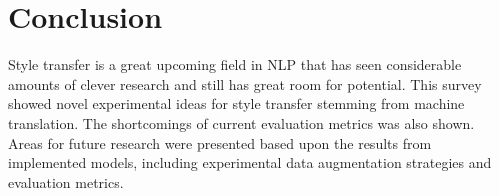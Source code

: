 \documentclass[12pt]{article}
\begin{document}
\section{Conclusion}
Style transfer is a great upcoming field in NLP that has seen 
considerable amounts of clever research and still has great room for potential.
This survey showed novel experimental ideas for style transfer stemming from machine 
translation. The shortcomings of current evaluation metrics was also shown. Areas for 
future research were presented based upon the results from implemented models, including 
experimental data augmentation strategies and evaluation metrics. 

\pagebreak

\end{document}
